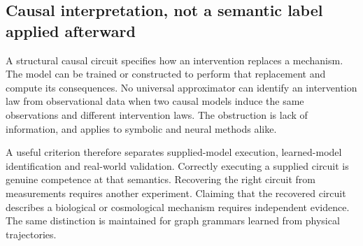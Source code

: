 \subsection{Causal interpretation, not a semantic label applied afterward}

A structural causal circuit specifies how an intervention replaces a mechanism. The model can be trained or constructed to perform that replacement and compute its consequences. No universal approximator can identify an intervention law from observational data when two causal models induce the same observations and different intervention laws. The obstruction is lack of information, and applies to symbolic and neural methods alike.

A useful criterion therefore separates supplied-model execution, learned-model identification and real-world validation. Correctly executing a supplied circuit is genuine competence at that semantics. Recovering the right circuit from measurements requires another experiment. Claiming that the recovered circuit describes a biological or cosmological mechanism requires independent evidence. The same distinction is maintained for graph grammars learned from physical trajectories.
